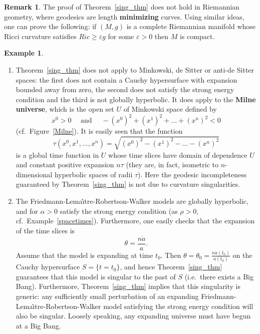 \documentclass[10pt]{amsart}
\theoremstyle{definition}
\newtheorem{Example}[Thm]{Example}
\newtheorem{Remark}[Thm]{Remark}
\theoremstyle{remark}
\begin{document}
\begin{Remark}
The proof of Theorem~\ref{sing_thm} does not hold in Riemannian geometry, where geodesics are length {\bf minimizing} curves. Using similar ideas, one can prove the following: if $(M,g)$ is a complete Riemannian manifold whose Ricci curvature satisfies $Ric \geq \varepsilon g$ for some $\varepsilon > 0$ then $M$ is compact.
\end{Remark}

\begin{Example} \hspace{1cm}
\begin{enumerate}
\item
Theorem~\ref{sing_thm} does not apply to Minkowski, de Sitter or anti-de Sitter spaces: the first does not contain a Cauchy hypersurface with expansion bounded away from zero, the second does not satisfy the strong energy condition and the third is not globally hyperbolic. It does apply to the {\bf Milne universe}, which is the open set $U$ of Minkowski space defined by
\[
x^0 > 0 \quad \text{ and } \quad - \left( x^0 \right)^2 + \left( x^1 \right)^2 + \ldots + \left( x^n \right)^2 < 0
\]
(cf.~Figure~\ref{Milne}). It is easily seen that the function
\[
\tau\left( x^0, x^1, \ldots, x^n \right) = \sqrt{\left( x^0 \right)^2 - \left( x^1 \right)^2 - \ldots - \left( x^n \right)^2}
\]
is a global time function in $U$ whose time slices have domain of dependence $U$ and constant positive expansion $n \tau$ (they are, in fact, isometric to $n$-dimensional hyperbolic spaces of radii $\tau$). Here the geodesic incompleteness guaranteed by Theorem~\ref{sing_thm} is not due to curvature singularities.
\item
The Friedmann-Lema\^\i tre-Robertson-Walker models are globally hyperbolic, and for $\alpha > 0$ satisfy the strong energy condition (as $\rho > 0$, cf.~Example~\ref{spacetimes}). Furthermore, one easily checks that the expansion of the time slices is
\[
\theta = \frac{n\dot{a}}{a}.
\]
Assume that the model is expanding at time $t_0$. Then $\theta = \theta_0 = \frac{n\dot{a}(t_0)}{a(t_0)}$ on the Cauchy hypersurface $S = \{ t=t_0 \}$, and hence Theorem~\ref{sing_thm} guarantees that this model is singular to the past of $S$ (i.e.~there exists a Big Bang). Furthermore, Theorem~\ref{sing_thm} implies that this singularity is generic: any sufficiently small perturbation of an expanding Friedmann-Lema\^\i tre-Robertson-Walker model satisfying the strong energy condition will also be singular. Loosely speaking, any expanding universe must have begun at a Big Bang.

\end{enumerate}
\end{Example}
\end{document}
